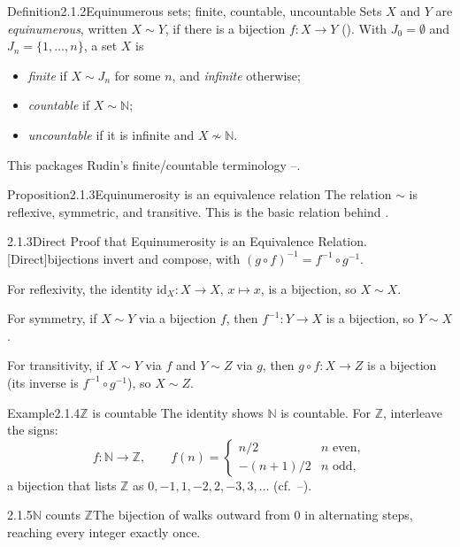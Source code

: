 \documentclass[main.tex]{subfiles}
\begin{document}
\begin{Obj}{Definition}{2.1.2}{Equinumerous sets; finite, countable, uncountable}
Sets $X$ and $Y$ are \emph{equinumerous}, written $X\sim Y$, if there is a bijection $f:X\to Y$
(). With
$J_0=\emptyset$ and $J_n=\{1,\dots,n\}$, a set $X$ is
\begin{itemize}
  \item \emph{finite} if $X\sim J_n$ for some $n$, and \emph{infinite} otherwise;
  \item \emph{countable} if $X\sim\mathbb N$;
  \item \emph{uncountable} if it is infinite and $X\not\sim\mathbb N$.
\end{itemize}
This packages Rudin's finite/countable terminology --.
\end{Obj}

\begin{Obj}{Proposition}{2.1.3}{Equinumerosity is an equivalence relation}
The relation $\sim$ is reflexive, symmetric, and transitive. This is the basic relation behind
.
\end{Obj}
\begin{Prf}{2.1.3}{Direct Proof that Equinumerosity is an Equivalence Relation.}{[Direct]\quad bijections invert and compose, with $(g\circ f)^{-1}=f^{-1}\circ g^{-1}$.}
\item For reflexivity, the identity $\mathrm{id}_X:X\to X$, $x\mapsto x$, is a bijection, so $X\sim X$.
\item For symmetry, if $X\sim Y$ via a bijection $f$, then $f^{-1}:Y\to X$ is a bijection, so $Y\sim X$.
\item For transitivity, if $X\sim Y$ via $f$ and $Y\sim Z$ via $g$, then $g\circ f:X\to Z$ is a
  bijection (its inverse is $f^{-1}\circ g^{-1}$), so $X\sim Z$.
\end{Prf}

\begin{ObjL}{Example}{2.1.4}{$\mathbb Z$ is countable}
The identity shows $\mathbb N$ is countable. For $\mathbb Z$, interleave the signs:
\[ f:\mathbb N\to\mathbb Z,\qquad f(n)=\begin{cases} n/2 & n\text{ even},\\[2pt] -(n+1)/2 & n\text{ odd},\end{cases} \]
a bijection that lists $\mathbb Z$ as $0,-1,1,-2,2,-3,3,\dots$ (cf.\ --).
\end{ObjL}

\begin{Fig}{2.1.5}{$\mathbb N$ counts $\mathbb Z$}{The bijection of  walks outward from $0$ in alternating steps, reaching every integer exactly once.}
\end{Fig}
\end{document}
